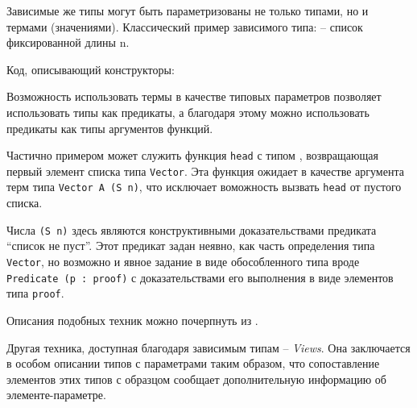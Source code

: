 \documentclass[aps,12pt,final,oneside,onecolumn,musixtex,superscriptaddress,centertags]{article}
\newcommand{\ctab}[0]{\indent\indent}
\newcommand{\ctabd}[0]{\ctab\ctab}
\newcommand{\ccode}[1]{\mbox{\texttt{#1}}}
\begin{document}
     Зависимые же типы могут быть параметризованы не только типами, но и термами (значениями). Классический пример зависимого типа: \vectortype\:-- список фиксированной длины n.

     Код, описывающий конструкторы:\\
     \vectorconst
     \newline

     Возможность использовать термы в качестве типовых параметров позволяет использовать типы как предикаты, а благодаря этому можно использовать предикаты как типы аргументов функций.

     Частично примером может служить функция \ccode{head} с типом \vectorheadtype, возвращающая первый элемент списка типа \ccode{Vector}. Эта функция ожидает в качестве аргумента терм типа \ccode{Vector A (S n)}, что исключает воможность вызвать \ccode{head} от пустого списка.

     Числа \ccode{(S n)} здесь являются конструктивными доказательствами предиката ``список не пуст''. Этот предикат задан неявно, как часть определения типа \ccode{Vector}, но возможно и явное задание в виде обособленного типа вроде \ccode{Predicate (p : proof)} с доказательствами его выполнения в виде элементов типа \ccode{proof}.

     Описания подобных техник можно почерпнуть из \cite{DBLP:conf/tldi/Norell09}.

     \newcommand{\paritydef}[0]{
        \ctab\ccode{data Parity : N -> Set where}\\
        \ctabd\ccode{even\hspace{2mm}: (k : N) -> Parity (k * 2)}\\
        \ctabd\ccode{odd \hspace{2mm}: (k : N) -> Parity (k * 2 + 1)}\\
     }
     \newcommand{\parityusage}[0]{
        \ctab\ccode{f : N -> ...}\\
        \ctab\ccode{f n with parity n --- parity : (n : N) -> Parity n}\\
        \ctab\ccode{f .(k * 2)     | even k = ...}\\
        \ctab\ccode{f .(k * 2 + 1) | odd  k = ...}\\
        \ctab\ccode{--- точка означает автоматически выводимый шаблон}
     }

     Другая техника, доступная благодаря зависимым типам -- \emph{Views}. Она заключается в особом описании типов с параметрами таким образом, что сопоставление элементов этих типов с образцом сообщает дополнительную информацию об элементе-параметре.
\end{document}
